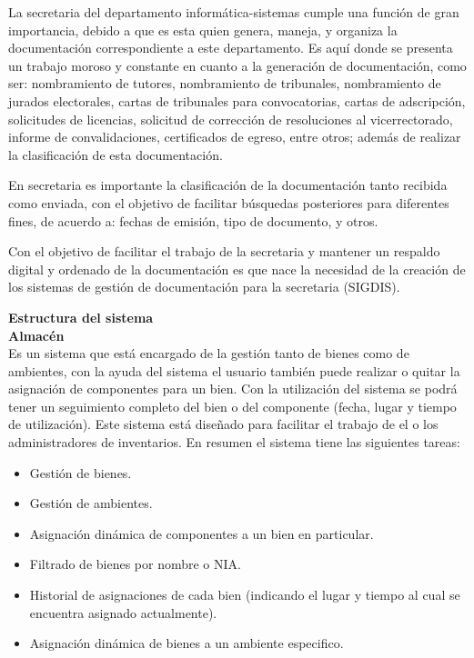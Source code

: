 \documentclass[10pt,letterpaper,twoside]{article}
\newcommand{\btext}[1]{
    \vspace{10mm}
    {{\textcolor{titlecolor}{\large{\textbf{\textsf{#1}}}}}}
    \vspace{5mm}
    \\
}
\newcommand{\ctext}[1]{
    \vspace{5mm}
    {{\textcolor{titlecolor}{\large{\textbf{\textsf{#1}}}}}}
    \\
}
\begin{document}
\begin{multicols}{2}
La secretaria del departamento informática-sistemas cumple una función de gran importancia, debido a que es esta quien genera, maneja, y organiza la documentación correspondiente a este departamento. Es aquí donde se presenta un trabajo moroso y constante en cuanto a la generación de documentación, como ser: nombramiento de tutores, nombramiento de tribunales, nombramiento de jurados electorales, cartas de tribunales para convocatorias, cartas de adscripción, solicitudes de licencias, solicitud de corrección de resoluciones al vicerrectorado, informe de convalidaciones, certificados de egreso, entre otros; además de realizar la clasificación de esta documentación.

En secretaria es importante la clasificación de la documentación tanto recibida como enviada, con el objetivo de facilitar búsquedas posteriores para diferentes fines, de acuerdo a: fechas de emisión, tipo de documento, y otros.

Con el objetivo de facilitar el trabajo de la secretaria y mantener un respaldo digital y ordenado de la documentación es que nace la necesidad de la creación de los sistemas de gestión de documentación para la secretaria (SIGDIS).

\btext{Estructura del sistema}

\ctext{Almacén}
Es un sistema que está encargado de la gestión tanto de bienes como de ambientes, con la ayuda del sistema el usuario también puede realizar o quitar la asignación de componentes para un bien.
Con la utilización del sistema se podrá tener un seguimiento completo del bien o del componente (fecha, lugar y tiempo de utilización).
Este sistema está diseñado para facilitar el trabajo de el o los administradores de inventarios.
En resumen el sistema tiene las siguientes tareas:
\begin{itemize}
    \item Gestión de bienes.
    \item Gestión de ambientes.
    \item Asignación dinámica de componentes a un bien en particular.
    \item Filtrado de bienes por nombre o NIA.
    \item Historial de asignaciones de cada bien (indicando el lugar y tiempo al cual se encuentra asignado actualmente).
    \item Asignación dinámica de bienes a un ambiente especifico.
\end{itemize}


\end{multicols}
\end{document}
